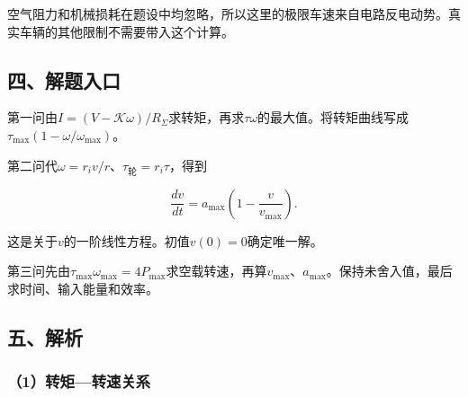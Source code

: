 \documentclass[12pt,a4paper,fontset=fandol]{ctexart}
\begin{document}
\begin{center}
\begin{minipage}{\linewidth}
\centering\begingroup{}
\ifdim\wd\diagrambox>.88\linewidth
\sbox{\diagrambox}{\resizebox{.88\linewidth}{!}{\usebox{\diagrambox}}}\fi
\ifdim\ht\diagrambox>.38\textheight
\resizebox{!}{.38\textheight}{\usebox{\diagrambox}}
\else\usebox{\diagrambox}\fi
\par{}\endgroup\end{minipage}\end{center}

空气阻力和机械损耗在题设中均忽略，所以这里的极限车速来自电路反电动势。真实车辆的其他限制不需要带入这个计算。

\subsection{四、解题入口}\label{ux56dbux89e3ux9898ux5165ux53e3-7}

第一问由\(I=(V-\mathcal K\omega)/R_\Sigma\)求转矩，再求\(\tau\omega\)的最大值。将转矩曲线写成\(\tau_{\max}(1-\omega/\omega_{\max})\)。

第二问代\(\omega=r_iv/r\)、\(\tau_{\text{轮}}=r_i\tau\)，得到

\[
\frac{dv}{dt}=a_{\max}\left(1-\frac v{v_{\max}}\right).
\]

这是关于\(v\)的一阶线性方程。初值\(v(0)=0\)确定唯一解。

第三问先由\(\tau_{\max}\omega_{\max}=4P_{\max}\)求空载转速，再算\(v_{\max}\)、\(a_{\max}\)。保持未舍入值，最后求时间、输入能量和效率。

\subsection{五、解析}\label{ux4e94ux89e3ux6790-7}

\subsubsection{（1）转矩---转速关系}\label{ux8f6cux77e9ux8f6cux901fux5173ux7cfb}
\end{document}
